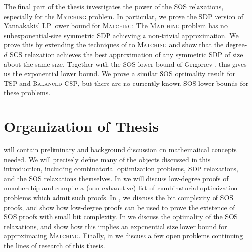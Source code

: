 The final part of the thesis investigates the power of the SOS relaxations, especially for the \textsc{Matching} problem. In particular, we prove the SDP version of Yannakakis' LP lower bound for \textsc{Matching}: The \textsc{Matching} problem has no subexponential-size symmetric SDP achieving a non-trivial approximation. We prove this by extending the techniques of \cite{LRST14} to \textsc{Matching} and show that the degree-$d$ SOS relaxation achieves the best approximation of any symmetric SDP  
of size about the same size. Together with the SOS lower bound of Grigoriev \cite{Gri01}, this gives us the exponential lower bound. We prove a similar SOS optimality result for \textsc{TSP} and \textsc{Balanced CSP}, but there are no currently known SOS lower bounds for these problems. 

\section{Organization of Thesis}

 will contain preliminary and background discussion on mathematical concepts needed. We will precisely define many of the objects discussed in this introduction, including combinatorial optimization problems, SDP relaxations, and the SOS relaxations themselves. In  we will discuss low-degree proofs of membership and compile a (non-exhaustive) list of combinatorial optimization problems which admit such proofs. In , we discuss the bit complexity of SOS proofs, and show how low-degree proofs can be used to prove the existence of SOS proofs with small bit complexity. In  we discuss the optimality of the SOS relaxations, and show how this implies an exponential size lower bound for approximating \textsc{Matching}. Finally, in  we discuss a few open problems continuing the lines of research of this thesis.



